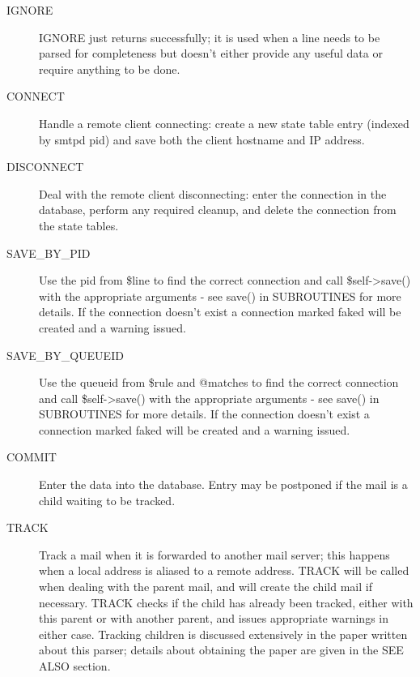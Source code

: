 \documentclass[a4paper,12pt,draft]{article}
\begin{document}
\begin{description}

    \item [IGNORE] IGNORE just returns successfully; it is used when a line
        needs to be parsed for completeness but doesn't either provide any
        useful data or require anything to be done.

    \item [CONNECT] Handle a remote client connecting: create a new state
        table entry (indexed by smtpd pid) and save both the client
        hostname and IP address.

    \item [DISCONNECT] Deal with the remote client disconnecting: enter the
        connection in the database, perform any required cleanup, and
        delete the connection from the state tables.

    \item [SAVE\_BY\_PID] Use the pid from \$line to find the correct
        connection and call \$self->save() with the appropriate arguments -
        see save() in SUBROUTINES for more details. If the connection
        doesn't exist a connection marked faked will be created and a
        warning issued.

    \item [SAVE\_BY\_QUEUEID] Use the queueid from \$rule and @matches to
        find the correct connection and call \$self->save() with the
        appropriate arguments - see save() in SUBROUTINES for more details.
        If the connection doesn't exist a connection marked faked will be
        created and a warning issued.

    \item [COMMIT] Enter the data into the database. Entry may be postponed
        if the mail is a child waiting to be tracked.

    \item [TRACK] Track a mail when it is forwarded to another mail server;
        this happens when a local address is aliased to a remote address.
        TRACK will be called when dealing with the parent mail, and will
        create the child mail if necessary. TRACK checks if the child has
        already been tracked, either with this parent or with another
        parent, and issues appropriate warnings in either case. Tracking
        children is discussed extensively in the paper written about this
        parser; details about obtaining the paper are given in the SEE ALSO
        section.


\end{description}
\end{document}
